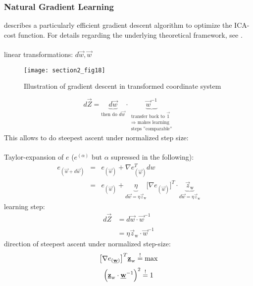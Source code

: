 \subsubsection{Natural Gradient Learning}
\textcite{Amari1998} describes a particularly efficient gradient descent algorithm to optimize the ICA-cost function. For details regarding the underlying theoretical framework, see \textcite{AmariEtAl2007}.\\\\
linear transformations: $d \vec{w}, \vec{w}$
\begin{figure}[h]
  \centering
\texttt{[image: section2\_fig18]}  
  \caption{Illustration of gradient descent in transformed coordinate system}
  \label{fig:NatGrad}
\end{figure}
\begin{equation}
	d \vec{Z} = \underbrace{ d \vec{w} }_{ \text{then do } d \vec{w} }
	\cdot \underbrace{ \vec{w}^{-1} }_{ \substack{
		\text{transfer back to } \vec{1} \\
		\Rightarrow \text{ makes learning} \\
		\text{steps ''comparable''}} }
\end{equation}
This allows to do steepest ascent under normalized step size:
\\\\
Taylor-expansion of $e$ ($e^{(\alpha)}$ but $\alpha$ supressed in the
following):
\begin{eqnarray}
  e_{(\vec{w} + d \vec{w})} & = & e_{(\vec{w})} + \nabla e_{(\vec{w})}^T dw \\
  & = & e_{(\vec{w})} 
  + \underbrace{ \eta }_{ d \vec{w} = \eta \vec{z}_{\mathrm{w}} }
  \big[ \nabla e_{(\vec{w})} \big]^T \cdot \underbrace{ \vec{z}_{
      \mathrm{w}} }_{
     d\vec{w} = \eta \vec{z}_{\mathrm{w}} }
\end{eqnarray}
learning step:
\begin{equation}
	\begin{array}{ll}
		d \vec{Z} 
		& = d \vec{w} \cdot \vec{w}^{-1} \\\\
		& = \eta \vec{z}_{\mathrm{w}} \cdot \vec{w}^{-1}
	\end{array}
\end{equation}
direction of steepest ascent under normalized step-size:
\begin{equation}
	\big[ \nabla e_{(\underline{\mathbf{w}})} \big]^T \underline{\mathbf{z}}_{\mathrm{w}} 
	\stackrel{\mathrm{!}}{=} \max
\end{equation}
\begin{equation}
	\Big( \underline{\mathbf{z}}_{\mathrm{w}} \cdot \underline{\mathbf{w}}^{-1} \Big)^2 \stackrel{\mathrm{!}}{=} 1
\end{equation}
